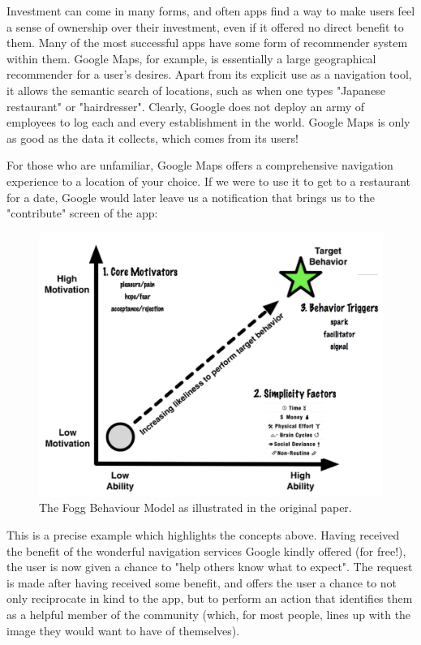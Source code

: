 Investment can come in many forms, and often apps find a way to make users feel a sense of ownership over their investment, even if it offered no direct benefit to them. Many of the most successful apps have some form of recommender system within them. Google Maps, for example, is essentially a large geographical recommender for a user's desires. Apart from its explicit use as a navigation tool, it allows the semantic search of locations, such as when one types "Japanese restaurant" or "hairdresser". Clearly, Google does not deploy an army of employees to log each and every establishment in the world. Google Maps is only as good as the data it collects, which comes from its users!

For those who are unfamiliar, Google Maps offers a comprehensive navigation experience to a location of your choice. If we were to use it to get to a restaurant for a date, Google would later leave us a notification that brings us to the "contribute" screen of the app:

\begin{figure}[h]
    \begin{center}
        \includegraphics[scale=0.3]{images/fogg_behaviour.png}
    \end{center}
    \caption{The Fogg Behaviour Model as illustrated in the original paper.}
    \label{fig:fogg_behaviour}
\end{figure}

This is a precise example which highlights the concepts above. Having received the benefit of the wonderful navigation services Google kindly offered (for free!), the user is now given a chance to "help others know what to expect". The request is made after having received some benefit, and offers the user a chance to not only reciprocate in kind to the app, but to perform an action that identifies them as a helpful member of the community (which, for most people, lines up with the image they would want to have of themselves).

